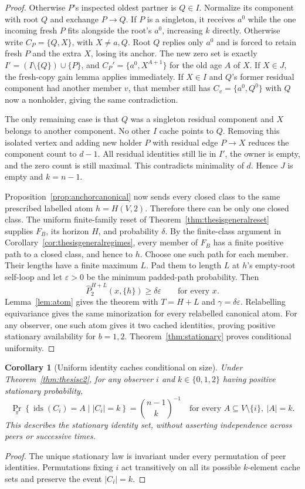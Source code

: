 \documentclass[11pt]{article}
\newtheorem{corollary}[theorem]{Corollary}
\begin{document}
\begin{proof}
Otherwise $P$'s inspected oldest partner is $Q\in I$.
Normalize its component with root $Q$ and exchange
$P\to Q$. If $P$ is a singleton, it receives $a^0$
while the one incoming fresh $P$ fits alongside the
root's $a^0$, increasing $k$ directly.
Otherwise write $C_P=\{Q,X\}$, with $X\ne a,Q$.
Root $Q$ replies only $a^0$ and is forced to retain
fresh $P$ and the extra $X$, losing its anchor. The new
zero set is exactly $I'=(I\setminus\{Q\})\cup\{P\}$,
and $C_P'=\{a^0,X^{A+1}\}$ for the old age $A$ of $X$.
If $X\in J$, the fresh-copy gain lemma applies immediately.
If $X\in I$ and $Q$'s former residual component had
another member $v$, that member still has
$C_v=\{a^0,Q^0\}$ with $Q$ now a nonholder, giving
the same contradiction.

The only remaining case is that $Q$ was a singleton
residual component and $X$ belongs to another component.
No other $I$ cache points to $Q$. Removing this isolated
vertex and adding new holder $P$ with residual edge
$P\to X$ reduces the component count to $d-1$.
All residual identities still lie in $I'$, the owner
is empty, and the zero count is still maximal. This
contradicts minimality of $d$. Hence $J$ is empty and
$k=n-1$.

Proposition~\ref{prop:anchorcanonical} now sends every
closed class to the same prescribed labelled atom
$h=H(V,2)$. Therefore there can be only one closed
class. The uniform finite-family reset of
Theorem~\ref{thm:thesisgeneralreset} supplies $F_B$, its
horizon $H$, and probability $\delta$.
By the finite-class argument in
Corollary~\ref{cor:thesisgeneralregimes}, every member
of $F_B$ has a finite positive path to a closed class,
and hence to $h$. Choose one such path for each member.
Their lengths have a finite maximum $L$.
Pad them to length $L$ at $h$'s empty-root self-loop and
let $\varepsilon>0$ be the minimum padded-path probability.
Then
\[
 \widehat P_2^{H+L}(x,\{h\})\ge\delta\varepsilon
 \qquad\text{for every }x.
\]
Lemma~\ref{lem:atom} gives the theorem with
$T=H+L$ and $\gamma=\delta\varepsilon$.
Relabelling equivariance gives the same minorization
for every relabelled canonical atom. For any observer,
one such atom gives it two cached identities, proving
positive stationary availability for $b=1,2$.
Theorem~\ref{thm:stationary} proves conditional uniformity.
\end{proof}

\begin{corollary}[Uniform identity caches conditional on size]
\label{cor:c2caches}
Under Theorem~\ref{thm:thesisc2}, for any observer $i$
and $k\in\{0,1,2\}$ having positive stationary probability,
\[
 \Pr_\pi\!\left\{\operatorname{ids}(C_i)=A
                 \mid |C_i|=k\right\}
 =\binom{n-1}{k}^{-1}
 \quad\text{for every }A\subseteq V\setminus\{i\},\ |A|=k.
\]
This describes the stationary identity set, without
asserting independence across peers or successive times.
\end{corollary}
\begin{proof}
The unique stationary law is invariant under every
permutation of peer identities. Permutations fixing $i$
act transitively on all its possible $k$-element cache
sets and preserve the event $|C_i|=k$.
\end{proof}
\end{document}
